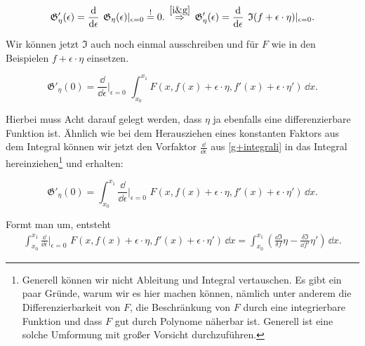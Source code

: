 \begin{equation}
 \mathfrak{G}'_{\eta}(\epsilon)
 = \frac{\mathrm{d}}{\mathrm{d}\epsilon} 
 \color{black}{\hspace{4pt} \mathfrak{G}_{\eta}(\epsilon)\vert_{\epsilon=0} 
 \overset{!}{=} 0}. \hspace{2pt}
 \overset{\ref{i&g}}{\Rightarrow} \hspace{2pt} \mathfrak{G}'_{\eta}(\epsilon)
 = \frac{\mathrm{d}}{\mathrm{d}\epsilon}  \hspace{4pt}
 \mathfrak{I}(f+\epsilon \cdot \eta) \vert_{\epsilon=0}.
\end{equation}

Wir können jetzt $\mathfrak{I}$ auch noch einmal ausschreiben und für $F$ wie in den Beispielen $f+ \epsilon \cdot \eta $ einsetzen.

\begin{equation} \label{g+integrali}
 \mathfrak{G}'_{\eta}(0)
 = \frac{\dd}{\dd\epsilon} \vert_{\epsilon=0} \hspace{4pt} \int_{x_0}^{x_1} F(x, f(x)
 + \epsilon \cdot \eta, f'(x) 
 + \epsilon \cdot {\eta}')\,\dd x.
\end{equation} %

Hierbei muss Acht darauf gelegt werden, dass $\eta$ ja ebenfalls eine differenzierbare Funktion ist. 
Ähnlich wie bei dem Herausziehen eines konstanten Faktors aus dem Integral können wir jetzt den Vorfaktor $\frac{\dd}{\dd\epsilon}$ aus \ref{g+integrali} in das Integral hereinziehen\footnote{Generell können wir nicht Ableitung und Integral vertauschen. 
Es gibt ein paar Gründe, warum wir es hier machen können, nämlich unter anderem die Differenzierbarkeit von $F$, die Beschränkung von $F$ durch eine integrierbare Funktion und dass $F$ gut durch Polynome näherbar ist. 
Generell ist eine solche Umformung mit großer Vorsicht durchzuführen.} und erhalten:

\begin{equation} \label{g+wholeintegral}
 \mathfrak{G}'_{\eta}(0)= 
 \int_{x_0}^{x_1} 
  \frac{\dd}{\dd\epsilon} \vert_{\epsilon=0} \hspace{4pt}
 F\left(x, f(x)+ \epsilon \cdot \eta, f'(x) + \epsilon \cdot {\eta}' \right) \,\dd x.
\end{equation} 


Formt man um, entsteht 
\begin{equation}
 \begin{gathered}
 \int_{x_0}^{x_1} 
  {\frac{\dd}{\dd\epsilon}\vert_{\epsilon=0}
  }   
  \hspace{4pt}
   F\left(x, f\left(x\right)+ \epsilon \cdot \eta, f'\left(x\right) 
   + \epsilon \cdot {\eta}'\right) \,\dd x  
    = \int_{x_0}^{x_1} \left( \frac{\dd\mathfrak{I}}{\delta f}\eta 
    - \frac{\delta \mathfrak{I}}{\dd f'}\eta'\right) \,\dd x. 
 \end{gathered}
\end{equation}

